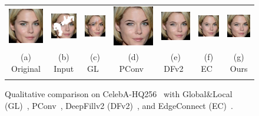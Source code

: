 \documentclass[10pt,journal,compsoc]{IEEEtran}
\begin{document}
\begin{figure}[hbt]
\begin{tabular}{ccccccc}
		\includegraphics[width=.135\textwidth]{celeba/GT59-0}  &
		\includegraphics[width=.135\textwidth]{celeba/input59-0}  &
		\includegraphics[width=.135\textwidth]{celeba/gl59-0}  &
		\includegraphics[width=.135\textwidth]{celeba/pconv59-0}  &
		\includegraphics[width=.135\textwidth]{celeba/gc59-0}  &
		\includegraphics[width=.135\textwidth]{celeba/ec59-0}  &
		\includegraphics[width=.135\textwidth]{celeba/ours59-0}  \\
		
		\scriptsize{(a) Original} &\scriptsize{(b) Input} & \scriptsize{(c) GL~\cite{IizukaGL}} &\scriptsize{(d) PConv~\cite{partialconv2017}} & \scriptsize{(e) DFv2~\cite{yu2018free}} &\scriptsize{(f) EC~\cite{nazeri2019edgeconnect}} & \scriptsize{(g) Ours} \\
		\vspace{-2mm}
	\end{tabular}
	\caption{Qualitative comparison on CelebA-HQ256~\cite{karras2017progressive} with Global\&Local (GL)~\cite{IizukaGL}, PConv~\cite{partialconv2017}, DeepFillv2 (DFv2)~\cite{yu2018free}, and EdgeConnect (EC)~\cite{nazeri2019edgeconnect}.}
	\label{fig:celeba}
\end{figure}
\end{document}
